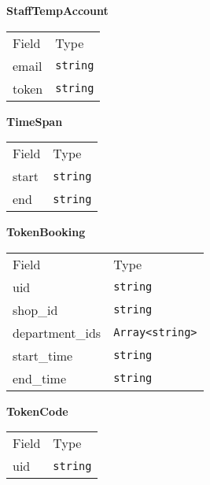     \begin{table}[H]
    \centering
    \textbf{StaffTempAccount}\\
    \everyrow{\tabucline[0.5pt]-}
    \begin{tabu} to 0.55\textwidth {|X|X|} \hline
    Field & Type \\
    email & \texttt{string} \\
token & \texttt{string} \\
\end{tabu}
\end{table}


    \begin{table}[H]
    \centering
    \textbf{TimeSpan}\\
    \everyrow{\tabucline[0.5pt]-}
    \begin{tabu} to 0.55\textwidth {|X|X|} \hline
    Field & Type \\
    start & \texttt{string} \\
end & \texttt{string} \\
\end{tabu}
\end{table}


    \begin{table}[H]
    \centering
    \textbf{TokenBooking}\\
    \everyrow{\tabucline[0.5pt]-}
    \begin{tabu} to 0.55\textwidth {|X|X|} \hline
    Field & Type \\
    uid & \texttt{string} \\
shop\_id & \texttt{string} \\
department\_ids & \texttt{Array<string>} \\
start\_time & \texttt{string} \\
end\_time & \texttt{string} \\
\end{tabu}
\end{table}


    \begin{table}[H]
    \centering
    \textbf{TokenCode}\\
    \everyrow{\tabucline[0.5pt]-}
    \begin{tabu} to 0.55\textwidth {|X|X|} \hline
    Field & Type \\
    uid & \texttt{string} \\
\end{tabu}
\end{table}


